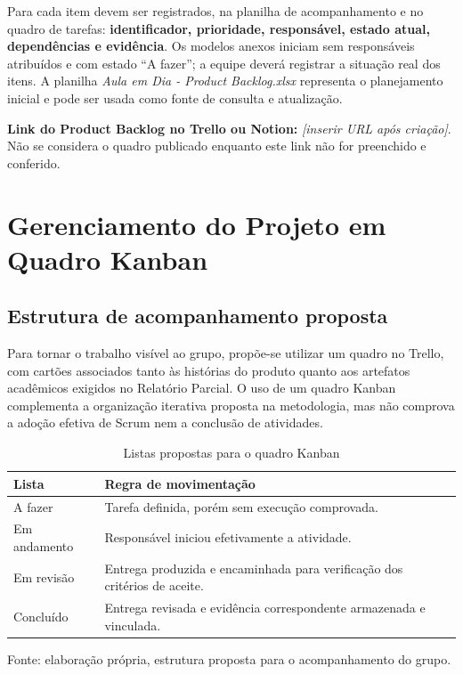 \documentclass[12pt,a4paper,oneside]{report}
\begin{document}
Para cada item devem ser registrados, na planilha de acompanhamento e no quadro de tarefas: \textbf{identificador, prioridade, responsável, estado atual, dependências e evidência}. Os modelos anexos iniciam sem responsáveis atribuídos e com estado ``A fazer''; a equipe deverá registrar a situação real dos itens. A planilha \textit{Aula em Dia - Product Backlog.xlsx} representa o planejamento inicial e pode ser usada como fonte de consulta e atualização.

\noindent\textbf{Link do Product Backlog no Trello ou Notion:} \emph{[inserir URL após criação]}. Não se considera o quadro publicado enquanto este link não for preenchido e conferido.

\section{Gerenciamento do Projeto em Quadro Kanban}
\label{sec:kanban}

\subsection{Estrutura de acompanhamento proposta}
Para tornar o trabalho visível ao grupo, propõe-se utilizar um quadro no Trello, com cartões associados tanto às histórias do produto quanto aos artefatos acadêmicos exigidos no Relatório Parcial. O uso de um quadro Kanban complementa a organização iterativa proposta na metodologia, mas não comprova a adoção efetiva de Scrum nem a conclusão de atividades.

\begin{table}[htbp]
\centering
\caption{Listas propostas para o quadro Kanban}
\small
\renewcommand{\arraystretch}{1.2}
\begin{tabularx}{\textwidth}{@{}>{\RaggedRight\arraybackslash}p{2.8cm}>{\RaggedRight\arraybackslash}X@{}}
\toprule
\textbf{Lista} & \textbf{Regra de movimentação} \\
\midrule
A fazer & Tarefa definida, porém sem execução comprovada. \\
Em andamento & Responsável iniciou efetivamente a atividade. \\
Em revisão & Entrega produzida e encaminhada para verificação dos critérios de aceite. \\
Concluído & Entrega revisada e evidência correspondente armazenada e vinculada. \\
\bottomrule
\end{tabularx}
\par\smallskip
\begin{minipage}{\textwidth}\footnotesize Fonte: elaboração própria, estrutura proposta para o acompanhamento do grupo.\end{minipage}
\end{table}
\end{document}
